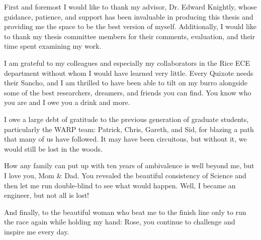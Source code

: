 
\begin{acknowledgements}

First and foremost I would like to thank my advisor, Dr. Edward Knightly, whose guidance, patience, and support has been invaluable in producing this thesis and providing me the space to be the best version of myself.  
Additionally, I would like to thank my thesis committee members for their comments, evaluation, and their time spent examining my work. 

I am grateful to my colleagues and especially my collaborators in the Rice ECE department without whom I would have learned very little.
Every Quixote needs their Sancho, and I am thrilled to have been able to tilt on my burro alongside some of the best researchers, dreamers, and friends you can find.
You know who you are and I owe you a drink and more.

I owe a large debt of gratitude to the previous generation of graduate students, particularly the WARP team: Patrick, Chris, Gareth, and Sid, for blazing a path that many of us have followed.
It may have been circuitous, but without it, we would still be lost in the woods.

How any family can put up with ten years of ambivalence is well beyond me, but I love you, Mom \& Dad.
You revealed the beautiful consistency of Science and then let me run double-blind to see what would happen. Well, I became an engineer, but not all is lost!

And finally, to the beautiful woman who beat me to the finish line only to run the race again while holding my hand: Rose, you continue to challenge and inspire me every day.


\end{acknowledgements}